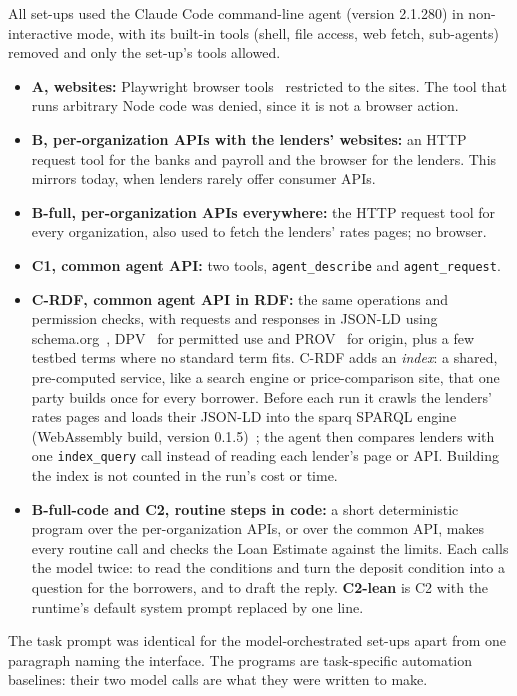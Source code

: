 \documentclass[11pt]{article}
\begin{document}
All set-ups used the Claude Code command-line agent (version 2.1.280) in non-interactive mode, with its built-in tools (shell, file access, web fetch, sub-agents) removed and only the set-up's tools allowed.
\begin{itemize}
\item \textbf{A, websites:} Playwright browser tools~\cite{playwrightmcp} restricted to the sites. The tool that runs arbitrary Node code was denied, since it is not a browser action.
\item \textbf{B, per-organization APIs with the lenders' websites:} an HTTP request tool for the banks and payroll and the browser for the lenders. This mirrors today, when lenders rarely offer consumer APIs.
\item \textbf{B-full, per-organization APIs everywhere:} the HTTP request tool for every organization, also used to fetch the lenders' rates pages; no browser.
\item \textbf{C1, common agent API:} two tools, \texttt{agent\_describe} and \texttt{agent\_request}.
\item \textbf{C-RDF, common agent API in RDF:} the same operations and permission checks, with requests and responses in JSON-LD using schema.org~\cite{schemaorg}, DPV~\cite{dpv} for permitted use and PROV~\cite{prov} for origin, plus a few testbed terms where no standard term fits. C-RDF adds an \emph{index}: a shared, pre-computed service, like a search engine or price-comparison site, that one party builds once for every borrower. Before each run it crawls the lenders' rates pages and loads their JSON-LD into the sparq SPARQL engine (WebAssembly build, version 0.1.5)~\cite{sparq}; the agent then compares lenders with one \texttt{index\_query} call instead of reading each lender's page or API. Building the index is not counted in the run's cost or time.
\item \textbf{B-full-code and C2, routine steps in code:} a short deterministic program over the per-organization APIs, or over the common API, makes every routine call and checks the Loan Estimate against the limits. Each calls the model twice: to read the conditions and turn the deposit condition into a question for the borrowers, and to draft the reply. \textbf{C2-lean} is C2 with the runtime's default system prompt replaced by one line.
\end{itemize}
The task prompt was identical for the model-orchestrated set-ups apart from one paragraph naming the interface. The programs are task-specific automation baselines: their two model calls are what they were written to make.
\end{document}
